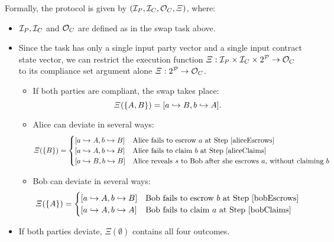 Formally, the protocol is given by $({\mathcal I}_P,{\mathcal I}_C,{\mathcal O}_C,\Xi)$, where:
\begin{itemize}
\item
  ${\mathcal I}_P, {\mathcal I}_C$ and ${\mathcal O}_C$ are defined as in the swap task above.
\item
  Since the task has only a single input party vector
  and a single input contract state vector,
  we can restrict the execution function
  $\Xi: {\mathcal I}_P \times {\mathcal I}_C \times 2^{{\mathcal P}} \to {\mathcal O}_C$
  to its compliance set argument alone
  $\Xi: 2^{{\mathcal P}} \to {\mathcal O}_C$.
  \begin{itemize}
  \item
    If both parties are compliant, the swap takes place:
    \begin{equation}
      \eqnlabel{bothComply}
      \Xi(\set{A,B}) = [a \hookrightarrow B, b \hookrightarrow A].
    \end{equation}
  \item
    Alice can deviate in several ways:
    \begin{equation*}
      \eqnlabel{bobComplies}
      \Xi(\set{B}) = \begin{cases}
        [a \hookrightarrow A, b \hookrightarrow B]
          &\text{Alice fails to escrow $a$ at Step \ref{aliceEscrows}}\\
        [a \hookrightarrow A, b \hookrightarrow B]
          &\text{Alice fails to claim $b$ at Step \ref{aliceClaims}}\\
        [a \hookrightarrow B, b \hookrightarrow B]
          &\text{Alice reveals $s$ to Bob after she escrows $a$, without claiming $b$}
      \end{cases}
    \end{equation*}

  \item
    Bob can deviate in several ways:
    \begin{equation*}
      \eqnlabel{aliceComplies}
      \Xi(\set{A}) = \begin{cases}
        [a \hookrightarrow A, b \hookrightarrow B]
          &\text{Bob fails to escrow $b$ at Step \ref{bobEscrows}}\\
        [a \hookrightarrow A, b \hookrightarrow A]
          &\text{Bob fails to claim $a$ at Step \ref{bobClaims}}
      \end{cases}
    \end{equation*}
  \end{itemize}

\item
  If both parties deviate, $\Xi(\emptyset)$ contains all four outcomes.
\end{itemize}

